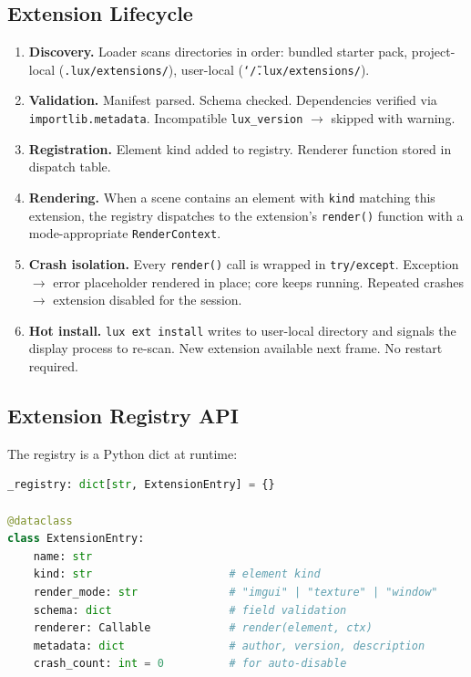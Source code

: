\documentclass[a4paper,10pt]{article}
\newcommand{\api}[1]{\texttt{#1}}
\newcommand{\field}[1]{\texttt{#1}}
\begin{document}
\subsection{Extension Lifecycle}

\begin{enumerate}
  \item \textbf{Discovery.}  Loader scans directories in order:
    bundled starter pack, project-local
    (\texttt{.lux/extensions/}), user-local
    (\texttt{\char`\~/.lux/extensions/}).
  \item \textbf{Validation.}  Manifest parsed.  Schema checked.
    Dependencies verified via \texttt{importlib.metadata}.
    Incompatible \field{lux\_version} $\to$ skipped with warning.
  \item \textbf{Registration.}  Element kind added to registry.
    Renderer function stored in dispatch table.
  \item \textbf{Rendering.}  When a scene contains an element with
    \field{kind} matching this extension, the registry dispatches
    to the extension's \texttt{render()} function with a
    mode-appropriate \texttt{RenderContext}.
  \item \textbf{Crash isolation.}  Every \texttt{render()} call is
    wrapped in \texttt{try/except}.  Exception $\to$ error
    placeholder rendered in place; core keeps running.  Repeated
    crashes $\to$ extension disabled for the session.
  \item \textbf{Hot install.}  \api{lux ext install} writes to
    user-local directory and signals the display process to re-scan.
    New extension available next frame.  No restart required.
\end{enumerate}

\subsection{Extension Registry API}

The registry is a Python dict at runtime:

\begin{lstlisting}[language=Python]
_registry: dict[str, ExtensionEntry] = {}

@dataclass
class ExtensionEntry:
    name: str
    kind: str                     # element kind
    render_mode: str              # "imgui" | "texture" | "window"
    schema: dict                  # field validation
    renderer: Callable            # render(element, ctx)
    metadata: dict                # author, version, description
    crash_count: int = 0          # for auto-disable
\end{lstlisting}
\end{document}
